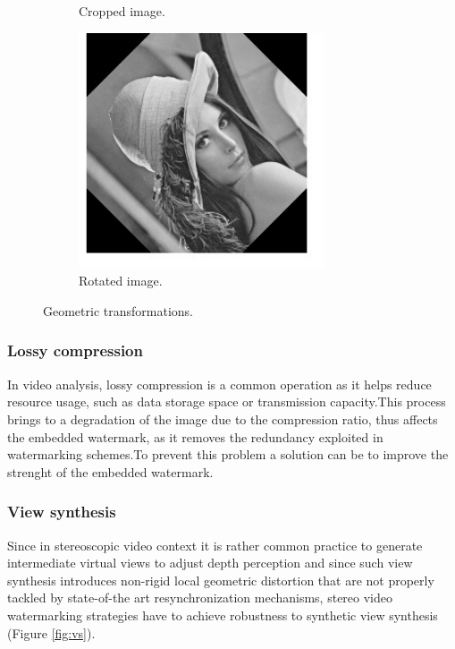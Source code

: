 \begin{figure}[h!]
\begin{subfigure}[]{0.4\textwidth}
\caption{\small{Cropped image.}}
\label{fig:geom2}
  \end{subfigure}
\begin{subfigure}[]{0.4\textwidth}
\centering
\includegraphics[width=0.8\textwidth]{./img/rot.jpg}
\caption{\small{Rotated image.}}
\label{fig:geom3}
\end{subfigure}
\caption{\small{Geometric transformations.}\label{geom}}
\end{figure}

\subsubsection{Lossy compression}
In video analysis, lossy compression is a common operation as it helps reduce resource usage, such as data storage space or transmission capacity.\newline  This process brings to a degradation of the image due to the compression ratio, thus affects the embedded watermark, as it removes the redundancy exploited in
watermarking schemes.\newline To prevent this problem a solution can be to improve the strenght of the embedded watermark.

\subsubsection{View synthesis}
Since in stereoscopic video context it is rather common practice to generate intermediate virtual views to adjust depth perception and since such view synthesis introduces non-rigid local geometric distortion that are not properly tackled by state-of-the art resynchronization mechanisms, stereo video watermarking strategies have to achieve robustness to synthetic view synthesis (Figure \ref{fig:vs}).\\


